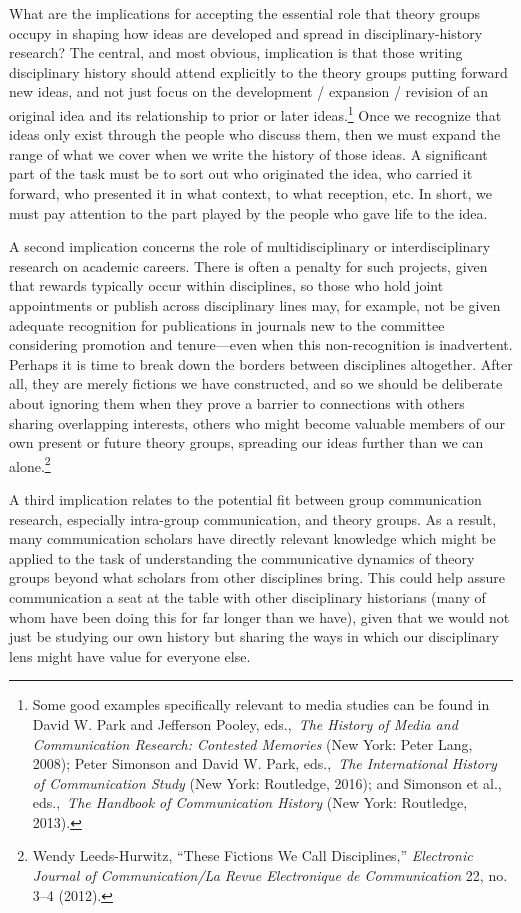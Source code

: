 \documentclass{tufte-handout}
\begin{document}
What are the implications for accepting the essential role that theory
groups occupy in shaping how ideas are developed and spread in
disciplinary-history research? The central, and most obvious,
implication is that those writing disciplinary history should attend
explicitly to the theory groups putting forward new ideas, and not just
focus on the development / expansion / revision of an original idea and
its relationship to prior or later
ideas.\footnote{Some good examples specifically relevant to media studies can be found
  in David W. Park and Jefferson Pooley, eds.,~\emph{The History of
  Media and Communication Research: Contested Memories} (New York: Peter
  Lang, 2008); Peter Simonson and David W. Park, eds.,~\emph{The
  International History of Communication Study} (New York: Routledge,
  2016); and Simonson et al., eds.,~\emph{The Handbook of Communication
  History} (New York: Routledge, 2013).
} Once we recognize that
ideas only exist through the people who discuss them, then we must
expand the range of what we cover when we write the history of those
ideas. A significant part of the task must be to sort out who originated
the idea, who carried it forward, who presented it in what context, to
what reception, etc. In short, we must pay attention to the part played
by the people who gave life to the idea.

A second implication concerns the role of multidisciplinary or
interdisciplinary research on academic careers. There is often a penalty
for such projects, given that rewards typically occur within
disciplines, so those who hold joint appointments or publish across
disciplinary lines may, for example, not be given adequate recognition
for publications in journals new to the committee considering promotion
and tenure---even when this non-recognition is inadvertent. Perhaps it
is time to break down the borders between disciplines altogether. After
all, they are merely fictions we have constructed, and so we should be
deliberate about ignoring them when they prove a barrier to connections
with others sharing overlapping interests, others who might become
valuable members of our own present or future theory groups, spreading
our ideas further than we can
alone.\footnote{Wendy Leeds-Hurwitz, ``These Fictions We Call Disciplines,''
  \emph{Electronic Journal of Communication/La Revue Electronique de
  Communication} 22, no. 3--4 (2012).
}

A third implication relates to the potential fit between group
communication research, especially intra-group communication, and theory
groups. As a result, many communication scholars have directly relevant
knowledge which might be applied to the task of understanding the
communicative dynamics of theory groups beyond what scholars from other
disciplines bring. This could help assure communication a seat at the
table with other disciplinary historians (many of whom have been doing
this for far longer than we have), given that we would not just be
studying our own history but sharing the ways in which our disciplinary
lens might have value for everyone else.
\end{document}
